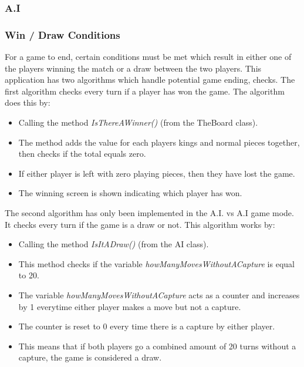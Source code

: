\documentclass[10pt, a4paper]{article}
\begin{document}
    
    	\subsubsection{A.I}
    	
    
    	\subsubsection{Win / Draw Conditions}    
    	For a game to end, certain conditions must be met which result in either one of the players winning the match or a draw between the two players. This application has two algorithms which handle potential game ending, checks. The first algorithm checks every turn if a player has won the game.
    	\newline
    	The algorithm does this by:
    	
    	\begin{itemize}
    	\item Calling the method \textit{IsThereAWinner()} (from the TheBoard class).
    	\item The method adds the value for each players kings and normal pieces together, then checks if the total equals zero.
    	\item If either player is left with zero playing pieces, then they have lost the game.
    	\item The winning screen is shown indicating which player has won.
    	\end{itemize}
    
    	The second algorithm has only been implemented in the A.I. vs A.I game mode. It checks every turn if the game is a draw or not.
    	\newline
    	This algorithm works by:
    	
    	\begin{itemize}
    	\item Calling the method \textit{IsItADraw()} (from the AI class).
    	\item This method checks if the variable \textit{howManyMovesWithoutACapture} is equal to 20.
    	\item The variable \textit{howManyMovesWithoutACapture} acts as a counter and increases by 1 everytime either player makes a move but not a capture.
    	\item The counter is reset to 0 every time there is a capture by either player.
    	\item This means that if both players go a combined amount of 20 turns without a capture, the game is considered a draw.
    	\end{itemize}
    	
\end{document}

